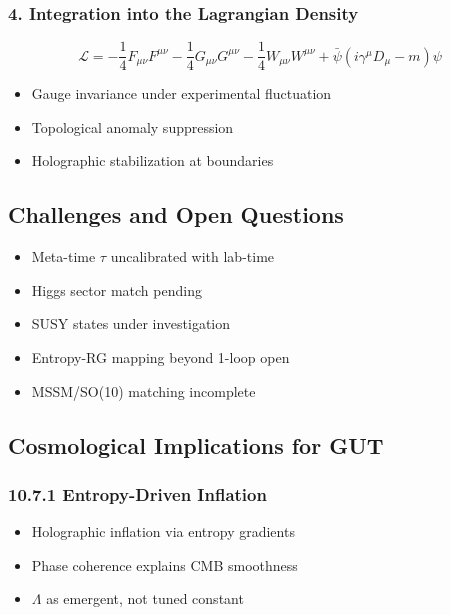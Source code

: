 \documentclass[10.5pt,a4paper]{article}
\begin{document}
\subsubsection*{4. Integration into the Lagrangian Density}

\[
    \mathcal{L} = -\frac{1}{4} F_{\mu\nu}F^{\mu\nu} - \frac{1}{4} G_{\mu\nu}G^{\mu\nu} - \frac{1}{4} W_{\mu\nu}W^{\mu\nu} + \bar{\psi}(i\gamma^\mu D_\mu - m)\psi
\]

\begin{itemize}
    \item Gauge invariance under experimental fluctuation
    \item Topological anomaly suppression
    \item Holographic stabilization at boundaries
\end{itemize}

\subsection{Challenges and Open Questions}

\begin{itemize}
    \item Meta-time \( \tau \) uncalibrated with lab-time
    \item Higgs sector match pending
    \item SUSY states under investigation
    \item Entropy-RG mapping beyond 1-loop open
    \item MSSM/SO(10) matching incomplete
\end{itemize}

\subsection{Cosmological Implications for GUT}

\subsubsection*{10.7.1 Entropy-Driven Inflation}

\begin{itemize}
    \item Holographic inflation via entropy gradients
    \item Phase coherence explains CMB smoothness
    \item \(\Lambda\) as emergent, not tuned constant
\end{itemize}
\end{document}
